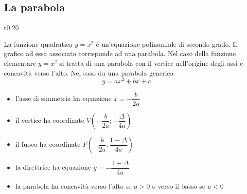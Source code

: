 \documentclass{article}     %
\begin{document}
    \subsection{La parabola}
        \begin{wrapfigure}[8]{r}{0.20\textwidth}
            \begin{center}
            \end{center}
        \end{wrapfigure}
        La funzione quadratica $y=x^2$ è un'equazione polinomiale di secondo grado. Il grafico ad essa associato corrisponde ad una parabola. Nel caso della funzione elementare $y=x^2$ si tratta di una parabola con il vertice nell'origine degli assi e concavità verso l'alto. Nel caso du una parabola generica \[y=ax^2+bx+c\]
        \begin{itemize}
            \item l'asse di simmetria ha equazione $x=-\dfrac{b}{2a}$
            \item il vertice ha coordinate $V\left(-\dfrac{b}{2a};-\dfrac{\Delta}{4a}\right)$
            \item il fuoco ha coordinate $F\left(-\dfrac{b}{2a};\dfrac{1-\Delta}{4a}\right)$
            \item la direttrice ha equazione $y=-\dfrac{1+\Delta}{4a}$
            \item la parabola ha concavità verso l'alto se $a>0$ o verso il basso se $a<0$
        \end{itemize}
\end{document}
